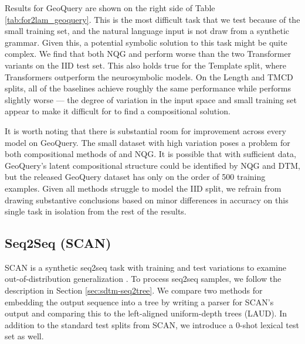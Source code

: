 Results for GeoQuery are shown on the right side of Table \ref{tab:for2lam_geoquery}. This is the most difficult task that we test because of the small training set, and the natural language input is not draw from a synthetic grammar. Given this, a potential symbolic solution to this task might be quite complex. We find that both NQG and \dtm perform worse than the two Transformer variants on the IID test set. This also holds true for the Template split, where Transformers outperform the neurosymbolic models. On the Length and TMCD splits, all of the baselines achieve roughly the same performance while \dtm performs slightly worse --- the degree of variation in the input space and small training set appear to make it difficult for \sdtm to find a compositional solution. 

It is worth noting that there is substantial room for improvement across every model on GeoQuery. The small dataset with high variation poses a problem for both compositional methods of \sdtm and NQG. It is possible that with sufficient data, GeoQuery's latent compositional structure could be identified by NQG and DTM, but the released GeoQuery dataset has only on the order of 500 training examples. Given all methods struggle to model the IID split, we refrain from drawing substantive conclusions based on minor differences in accuracy on this single task in isolation from the rest of the results. 


\subsection{Seq2Seq (SCAN)} \label{sec:sdtm-scan}
SCAN is a synthetic seq2seq task with training and test variations to examine out-of-distribution generalization \citep{Lake_2018_GeneralizationSystematicityCompositional}. To process seq2seq samples, we follow the description in Section \ref{sec:sdtm-seq2tree}. We compare two methods for embedding the output sequence into a tree by writing a parser for SCAN's output and comparing this to the left-aligned uniform-depth trees (LAUD). In addition to the standard test splits from SCAN, we introduce a 0-shot lexical test set as well.

